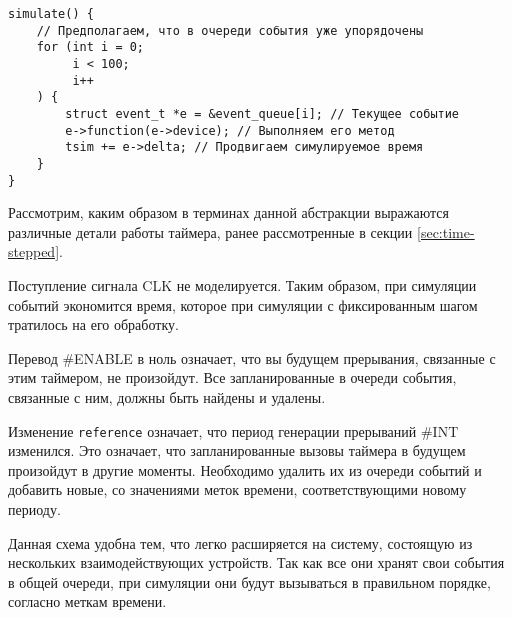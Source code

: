 \begin{lstlisting}
simulate() {
    // Предполагаем, что в очереди события уже упорядочены
    for (int i = 0;
         i < 100;
         i++
    ) {
        struct event_t *e = &event_queue[i]; // Текущее событие
        e->function(e->device); // Выполняем его метод
        tsim += e->delta; // Продвигаем симулируемое время
    }
}
\end{lstlisting}

Рассмотрим, каким образом в терминах данной абстракции выражаются различные детали работы таймера, ранее рассмотренные в секции \ref{sec:time-stepped}.
\begin{itemize*}
    \item Поступление сигнала CLK не моделируется. Таким образом, при симуляции событий экономится время, которое при симуляции с фиксированным шагом тратилось на его обработку.
    \item Перевод \#ENABLE в ноль означает, что вы будущем прерывания, связанные с этим таймером, не произойдут. Все запланированные в очереди события, связанные с ним, должны быть найдены и удалены.
    \item Изменение \texttt{reference} означает, что период генерации прерываний \#INT изменился. Это означает, что  запланированные вызовы таймера в будущем произойдут в другие моменты. Необходимо удалить их из очереди событий и добавить новые, со значениями меток времени, соответствующими новому периоду.
\end{itemize*}

Данная схема удобна тем, что легко расширяется на систему, состоящую из нескольких взаимодействующих устройств. Так как все они хранят свои события в общей очереди, при симуляции они будут вызываться в правильном порядке, согласно меткам времени.

